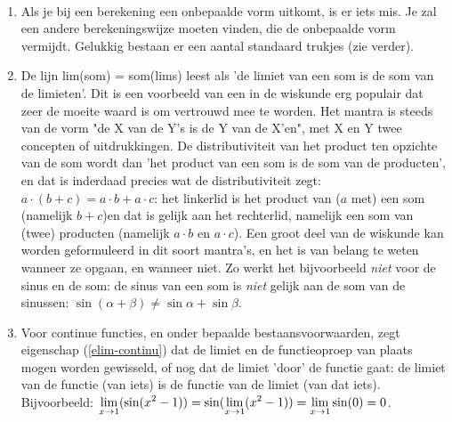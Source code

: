 \documentclass{ximera}
\begin{document}
\begin{remark} \ 
	
\begin{enumerate}
	\item Als je bij een berekening een onbepaalde vorm uitkomt, is er iets mis. Je zal een andere berekeningswijze moeten vinden, die de onbepaalde vorm vermijdt. Gelukkig bestaan er een aantal standaard trukjes (zie verder).
	\item De lijn lim(som) = som(lims) leest als 'de limiet van een som is de som van de limieten'. Dit is een voorbeeld van een in de wiskunde erg populair  dat zeer de moeite waard is om vertrouwd mee te worden. Het mantra is steeds van de vorm "de X van de Y's is de Y van de X'en", met X en Y twee concepten of uitdrukkingen. De distributiviteit van het product ten opzichte van de som wordt dan 'het product van een som is de som van de producten', en dat is inderdaad precies wat de distributiviteit zegt: $a\cdot(b+c) = a\cdot b+a\cdot c$: het linkerlid is het product van ($a$ met) een som (namelijk $b+c$)en dat is gelijk aan het rechterlid, namelijk een som van (twee) producten (namelijk $a\cdot b$ en $a\cdot c$). Een groot deel van de wiskunde kan worden geformuleerd in dit soort mantra's, en het is van belang te weten wanneer ze opgaan, en wanneer niet. Zo werkt het bijvoorbeeld \textit{niet} voor de sinus en de som: de sinus van een som is \textit{niet} gelijk aan de som van de sinussen: $\sin(\alpha+\beta) \neq \sin\alpha+\sin\beta$. 
	\item Voor continue functies, en onder bepaalde bestaansvoorwaarden, zegt eigenschap (\ref{elim-continu})  dat de limiet en de functieoproep van plaats mogen worden gewisseld, of nog dat de limiet 'door' de functie gaat: de limiet van de functie (van iets) is de functie van de limiet (van dat iets). Bijvoorbeeld: $\limxg{1}(\sin(x^2-1)) = \sin(\limxg{1}(x^2-1)) = \limxg{1}\sin(0) = 0$.


\end{enumerate}
\end{remark}
\end{document}
